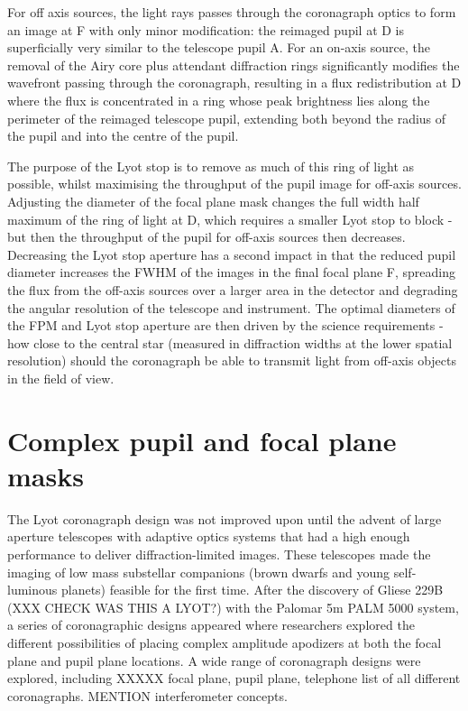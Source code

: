 \documentclass[letterpaper]{ar-1col}
\begin{document}
For off axis sources, the light rays passes through the coronagraph optics to form an image at F with only minor modification: the reimaged pupil at D is superficially very similar to the telescope pupil A.
%
For an on-axis source, the removal of the Airy core plus attendant diffraction rings significantly modifies the wavefront passing through the coronagraph, resulting in a flux redistribution at D where the flux is concentrated in a ring whose peak brightness lies along the perimeter of the reimaged telescope pupil, extending both beyond the radius of the pupil and into the centre of the pupil.

The purpose of the Lyot stop is to remove as much of this ring of light as possible, whilst maximising the throughput of the pupil image for off-axis sources.
%
Adjusting the diameter of the focal plane mask changes the full width half maximum of the ring of light at D, which requires a smaller Lyot stop to block - but then the throughput of the pupil for off-axis sources then decreases.
%
Decreasing the Lyot stop aperture has a second impact in that the reduced pupil diameter increases the FWHM of the images in the final focal plane F, spreading the flux from the off-axis sources over a larger area in the detector and degrading the angular resolution of the telescope and instrument.
%
The optimal diameters of the FPM and Lyot stop aperture are then driven by the science requirements - how close to the central star (measured in diffraction widths at the lower spatial resolution) should the coronagraph be able to transmit light from off-axis objects in the field of view.



\section{Complex pupil and focal plane masks}

The Lyot coronagraph design was not improved upon until the advent of large aperture telescopes with adaptive optics systems that had a high enough performance to deliver diffraction-limited images.
%
These telescopes made the imaging of low mass substellar companions (brown dwarfs and young self-luminous planets) feasible for the first time.
%
After the discovery of Gliese 229B (XXX CHECK WAS THIS A LYOT?) with the Palomar 5m PALM 5000 system, a series of coronagraphic designs appeared where researchers explored the different possibilities of placing complex amplitude apodizers at both the focal plane and pupil plane locations.
%
A wide range of coronagraph designs were explored, including XXXXX focal plane, pupil plane, telephone list of all different coronagraphs.
%
MENTION interferometer concepts.
\end{document}

